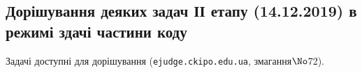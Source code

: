 {

\renewenvironment{problemAllDefault}[1]{\vspace{10mm}\par\begin{problem}{#1}{\stdinOrInputTxt}{\stdoutOrOutputTxt}{1 сек}{256 мегабайтів}}{\end{problem}}



\subsection{Дорішування деяких задач ІІ етапу (14.12.2019) в режимі здачі частини коду}
\label{sec:2019after-headers-footers}

Задачі доступні для дорішування (\verb"ejudge.ckipo.edu.ua", змагання\nolinebreak[3] $\No$72).



	
                                                   
	


\ERROR %

\label{text:2019after-headers-footers-end}
}